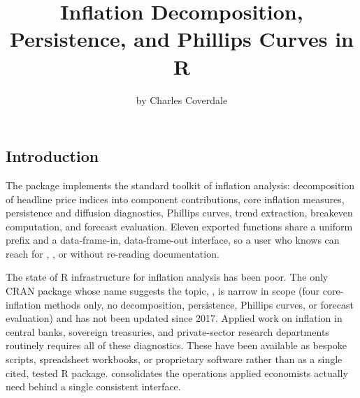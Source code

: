 \title{Inflation Decomposition, Persistence, and Phillips Curves in R}
\author{by Charles Coverdale}

\maketitle


\subsection{Introduction}\label{introduction}

The  package implements the standard toolkit of
inflation analysis: decomposition of headline price indices into
component contributions, core inflation measures, persistence and
diffusion diagnostics, Phillips curves, trend extraction, breakeven
computation, and forecast evaluation. Eleven exported functions share a
uniform  prefix and a data-frame-in, data-frame-out
interface, so a user who knows  can reach for
, , or 
without re-reading documentation.

The state of R infrastructure for inflation analysis has been poor. The
only CRAN package whose name suggests the topic, , is
narrow in scope (four core-inflation methods only, no decomposition,
persistence, Phillips curves, or forecast evaluation) and has not been
updated since 2017. Applied work on inflation in central banks,
sovereign treasuries, and private-sector research departments routinely
requires all of these diagnostics. These have been available as bespoke
scripts, spreadsheet workbooks, or proprietary software rather than as a
single cited, tested R package.  consolidates the
operations applied economists actually need behind a single consistent
interface.

